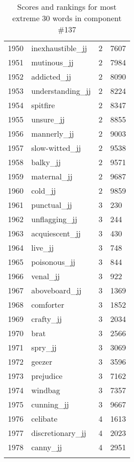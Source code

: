 \begin{longtable}[!htbp]{| rlr@{.}l |}
    1950 & inexhaustible\_jj & 2 & 7607 \\
    1951 & mutinous\_jj & 2 & 7984 \\
    1952 & addicted\_jj & 2 & 8090 \\
    1953 & understanding\_jj & 2 & 8224 \\
    1954 & spitfire & 2 & 8347 \\
    1955 & unsure\_jj & 2 & 8855 \\
    1956 & mannerly\_jj & 2 & 9003 \\
    1957 & slow-witted\_jj & 2 & 9538 \\
    1958 & balky\_jj & 2 & 9571 \\
    1959 & maternal\_jj & 2 & 9687 \\
    1960 & cold\_jj & 2 & 9859 \\
    1961 & punctual\_jj & 3 & 230 \\
    1962 & unflagging\_jj & 3 & 244 \\
    1963 & acquiescent\_jj & 3 & 430 \\
    1964 & live\_jj & 3 & 748 \\
    1965 & poisonous\_jj & 3 & 844 \\
    1966 & venal\_jj & 3 & 922 \\
    1967 & aboveboard\_jj & 3 & 1369 \\
    1968 & comforter & 3 & 1852 \\
    1969 & crafty\_jj & 3 & 2034 \\
    1970 & brat & 3 & 2566 \\
    1971 & spry\_jj & 3 & 3069 \\
    1972 & geezer & 3 & 3596 \\
    1973 & prejudice & 3 & 7162 \\
    1974 & windbag & 3 & 7357 \\
    1975 & cunning\_jj & 3 & 9667 \\
    1976 & celibate & 4 & 1613 \\
    1977 & discretionary\_jj & 4 & 2023 \\
    1978 & canny\_jj & 4 & 2951 \\
    \hline
    \caption{Scores and rankings for most extreme 30 words in component \#137} \\
\end{longtable}
